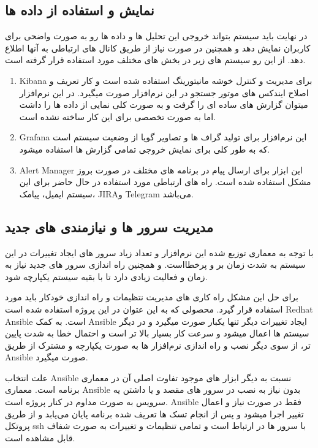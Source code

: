 \documentclass{llncs}
\begin{document}
\subsection{نمایش و استفاده از داده ها}
در نهایت باید سیستم بتواند خروجی این تحلیل ها و داده ها رو به صورت واضحی برای کاربران نمایش دهد و همچنین در صورت نیاز از طریق کانال های ارتباطی به آنها اطلاع دهد.
از این رو سیستم های زیر در بخش های مختلف مورد استفاده قرار گرفته است.
\begin{enumerate}
    \item Kibana
    \newline
    برای مدیریت و کنترل خوشه مانیتورینگ استفاده شده است و کار تعریف و اصلاح ایندکس های موتور جستجو در این نرم‌افزار صورت میگیرد.
    در این نرم‌افزار میتوان گزارش های ساده ای را گرفت و به صورت کلی نمایی از داده ها را داشت اما به صورت تخصصی برای این کار ساخته نشده است.
    \item Grafana
    \newline
    این نرم‌افزار برای تولید گراف ها و تصاویر گویا از وضعیت سیستم است که به طور کلی برای نمایش خروجی تمامی گزارش ها استفاده میشود.
    \item Alert Manager
    \newline
    این ابزار برای ارسال پیام در برنامه های مختلف در صورت بروز مشکل استفاده شده است.
    راه های ارتباطی مورد استفاده در حال حاضر برای این سیستم ایمیل، پیامک، JIRAو Telegram می‌باشد.
\end{enumerate}

\subsection{مدیریت سرور ها و نیازمندی های جدید}
با توجه به معماری توزیع شده این نرم‌افزار و تعداد زیاد سرور های ایجاد تغییرات در این سیستم به شدت زمان بر و پرخطااست.
و همچنین راه اندازی سرور های جدید نیاز به زمان و فعالیت زیادی دارد تا با بقیه سیستم یکپارچه شود.

برای حل این مشکل راه کاری های مدیریت نتظیمات و راه اندازی خودکار باید مورد استفاده قرار گیرد.
محصولی که به این عتوان در این پروژه استفاده شده است Redhat Ansible است.
به کمک Ansible ایجاد تغییرات دیگر تنها یکبار صورت میگیرد و در دیگر سیستم ها اعمال میشود و سرعت کار بسیار بالا تر است و احتمال خطا به شدت پایین تر، از سوی دیگر نصب و راه اندازی نرم‌افزار ها به صورت یکپارچه و مشترک از طریق Ansible صورت میگیرد.

علت انتخاب Ansible نسبت به دیگر ابزار های موجود تفاوت اصلی آن در معماری برنامه است. معماری Ansible بدون نیاز به نصب در سرور های مقصد و یا داشتن یه سرویس به صورت مداوم در کنار پروژه است. Ansible فقط در صورت نیاز و اعمال تغییر اجرا میشود و پس از انجام تسک ها تعریف شده برنامه پایان می‌یابد و از طریق پروتکل ssh با سرور ها در ارتباط است و تمامی تنظیمات و تغییرات به صورت شفاف قابل مشاهده است.
\end{document}
